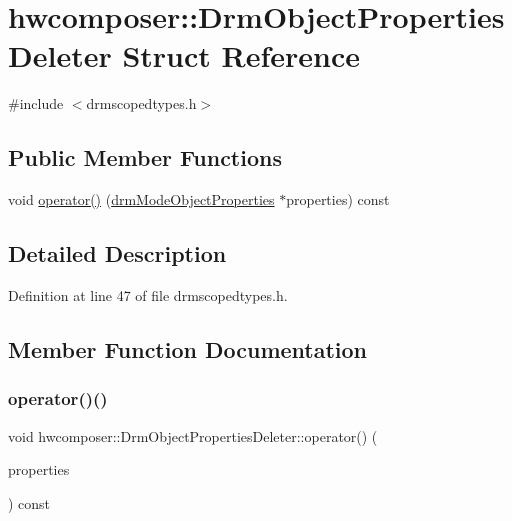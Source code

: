 \hypertarget{structhwcomposer_1_1DrmObjectPropertiesDeleter}{}\section{hwcomposer\+:\+:Drm\+Object\+Properties\+Deleter Struct Reference}
\label{structhwcomposer_1_1DrmObjectPropertiesDeleter}


{\ttfamily \#include $<$drmscopedtypes.\+h$>$}

\subsection*{Public Member Functions}
\begin{DoxyCompactItemize}
\item 
void \mbox{\hyperlink{structhwcomposer_1_1DrmObjectPropertiesDeleter_a422077ad73073131fc20ebf884d9587e}{operator()}} (\mbox{\hyperlink{drmscopedtypes_8h_a5b9e41a0b21c1a9017be96cfdf9f049c}{drm\+Mode\+Object\+Properties}} $\ast$properties) const
\end{DoxyCompactItemize}


\subsection{Detailed Description}


Definition at line 47 of file drmscopedtypes.\+h.



\subsection{Member Function Documentation}
\mbox{\label{structhwcomposer_1_1DrmObjectPropertiesDeleter_a422077ad73073131fc20ebf884d9587e}} 
\subsubsection{\texorpdfstring{operator()()}{operator()()}}
{\footnotesize\ttfamily void hwcomposer\+::\+Drm\+Object\+Properties\+Deleter\+::operator() (\begin{DoxyParamCaption}\item[{\mbox{\hyperlink{drmscopedtypes_8h_a5b9e41a0b21c1a9017be96cfdf9f049c}{drm\+Mode\+Object\+Properties}} $\ast$}]{properties }\end{DoxyParamCaption}) const}



